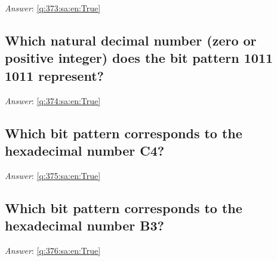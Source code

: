 \documentclass[a4paper,11pt,oneside]{article}
\begin{document}
\begin{sloppypar}
\label{q:373:sa:en:False}

\vspace{2cm}

\noindent\makebox[\textwidth]{\hrulefill}

\vspace{1cm}

\textit{Answer}: \autoref{q:373:sa:en:True}



\subsection{Which natural decimal number (zero or positive integer) does the bit pattern 1011 1011 represent?}

\label{q:374:sa:en:False}

\vspace{2cm}

\noindent\makebox[\textwidth]{\hrulefill}

\vspace{1cm}

\textit{Answer}: \autoref{q:374:sa:en:True}



\subsection{Which bit pattern corresponds to the hexadecimal number C4?}

\label{q:375:sa:en:False}

\vspace{2cm}

\noindent\makebox[\textwidth]{\hrulefill}

\vspace{1cm}

\textit{Answer}: \autoref{q:375:sa:en:True}



\subsection{Which bit pattern corresponds to the hexadecimal number B3?}

\label{q:376:sa:en:False}

\vspace{2cm}

\noindent\makebox[\textwidth]{\hrulefill}

\vspace{1cm}

\textit{Answer}: \autoref{q:376:sa:en:True}




\end{sloppypar}
\end{document}
